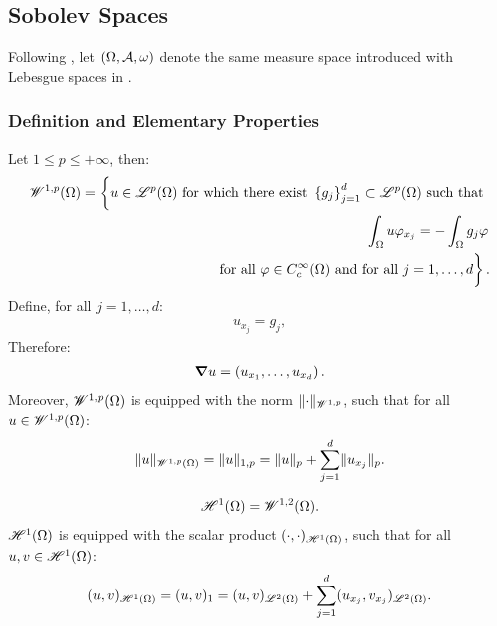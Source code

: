 \newpage
\subsection{Sobolev Spaces} \label{subsection:sobolev}

Following \cite[p.~267]{Brezis2010}, let $(\Omega, \mathcal{A}, \omega)$ denote the same measure space introduced with Lebesgue spaces in .

\subsubsection{Definition and Elementary Properties}

\begin{definition}
    Let $1 \leq p \leq +\infty$, then:
    \begin{align} %
        \SpaceWkp{1}{p}(\Omega) = \left\{ \vphantom{\int_{\Omega}} u \in \SpaceLp{p}(\Omega) \text{ for which there exist } \left\{ g_j \right\}_{j = 1}^{d} \subset \SpaceLp{p}(\Omega) \text{ such that } \right. \notag \\ 
        \left. \int_{\Omega} u \varphi_{x_j} = - \int_{\Omega} g_j \varphi \right. \notag \\
        \left. \text{ for all } \varphi \in C_c^{\infty}(\Omega) \text{ and for all } j = 1, \dots, d \vphantom{\int_{\Omega}} \right\}.
    \end{align}
    Define, for all $j = 1, \dots, d$:
    \begin{align}
        u_{x_j} = g_j,
    \end{align}
    Therefore:
    \begin{align}
        \bm{\nabla} u = \left( u_{x_1}, \dots, u_{x_d} \right).
    \end{align}
    Moreover, $\mathscr{W}^{1, p}(\Omega)$ is equipped with the norm $\lVert \cdot \rVert_{\mathscr{W}^{1, p}}$, such that for all $u \in \mathscr{W}^{1, p}(\Omega)$:
    \begin{align}
        \lVert u \rVert_{\mathscr{W}^{1, p}(\Omega)} = \lVert u \rVert_{1, p} = \lVert u \rVert_p + \sum_{j = 1}^d \lVert u_{x_j} \rVert_p.
    \end{align}
\end{definition}

\begin{definition}
    \begin{align}
        \mathscr{H}^{1}(\Omega) = \mathscr{W}^{1, 2}(\Omega).
    \end{align}
    $\mathscr{H}^{1}(\Omega)$ is equipped with the scalar product $(\cdot, \cdot)_{\mathscr{H}^{1}(\Omega)}$, such that for all $u, v \in \mathscr{H}^{1}(\Omega)$:
    \begin{align}
        (u, v)_{\mathscr{H}^{1}(\Omega)} = (u, v)_1 = (u, v)_{\mathscr{L}^{2}(\Omega)} + \sum_{j = 1}^d (u_{x_j}, v_{x_j})_{\mathscr{L}^{2}(\Omega)}.
    \end{align}
\end{definition}

